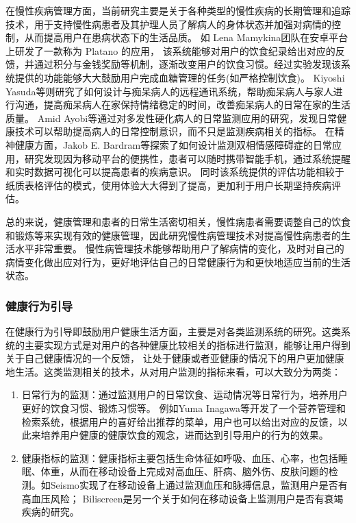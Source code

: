 在慢性疾病管理方面，当前研究主要是关于各种类型的慢性疾病的长期管理和追踪技术，用于支持慢性病患者及其护理人员了解病人的身体状态并加强对病情的控制，从而提高用户在患病状态下的生活品质。
如 Lena Mamykina\cite{burgermaster2019personal}团队在安卓平台上研发了一款称为 Platano 的应用，
该系统能够对用户的饮食纪录给出对应的反馈，并通过积分与金钱奖励等机制，逐渐改变用户的饮食习惯。经过实验发现该系统提供的功能能够大大鼓励用户完成血糖管理的任务(如严格控制饮食)。
Kiyoshi Yasuda等\cite{lazar2016evaluation}则研究了如何设计与痴呆病人的远程通讯系统，帮助痴呆病人与家人进行沟通，提高痴呆病人在家保持情绪稳定的时间，改善痴呆病人的日常在家的生活质量。
Amid Ayobi等\cite{ayobi2017quantifying}通过对多发性硬化病人的日常监测应用的研究，发现日常健康技术可以帮助提高病人的日常控制意识，而不只是监测疾病相关的指标。
在精神健康方面，Jakob E. Bardram等\cite{bardram2013designing}探索了如何设计监测双相情感障碍症的日常应用，研究发现因为移动平台的便携性，患者可以随时携带智能手机，通过系统提醒和实时数据可视化可以提高患者的疾病意识。
同时该系统提供的评估功能相较于纸质表格评估的模式，使用体验大大得到了提高，更加利于用户长期坚持疾病评估。

总的来说，健康管理和患者的日常生活密切相关，慢性病患者需要调整自己的饮食和锻炼等来实现有效的健康管理\cite{nunes2018understanding}，因此研究慢性病管理技术对提高慢性病患者的生活水平非常重要。
慢性病管理技术能够帮助用户了解病情的变化，及时对自己的病情变化做出应对行为，更好地评估自己的日常健康行为和更快地适应当前的生活状态\cite{ayobi2017quantifying}。


\subsubsection{健康行为引导}
在健康行为引导即鼓励用户健康生活方面，主要是对各类监测系统的研究。这类系统的主要实现方式是对用户的各种健康比较相关的指标进行监测，能够让用户得到关于自己健康情况的一个反馈，
让处于健康或者亚健康的情况下的用户更加健康地生活。这类监测相关的技术，从对用户监测的指标来看，可以大致分为两类：
\begin{enumerate}

    \item 日常行为的监测：通过监测用户的日常饮食、运动情况等日常行为，培养用户更好的饮食习惯、锻炼习惯等\cite{purpura2011fit4life, Inagawa2013A,bravata2007using,cordeiro2015barriers,lin2006fish, miller2014stepstream}。 例如Yuma Inagawa等\cite{Inagawa2013A}开发了一个营养管理和检索系统，根据用户的喜好给出推荐的菜单，用户也可以给出对应的反馈，以此来培养用户健康的健康饮食的观念，进而达到引导用户的行为的效果。

    \item 健康指标的监测：健康指标主要包括生命体征如呼吸、血压、心率，也包括睡眠、体重，从而在移动设备上完成对高血压、肝病、脑外伤、皮肤问题的检测\cite{liang2020oralcam}。如Seismo\cite{wang2018seismo}实现了在移动设备上通过监测血压和脉搏信息，监测用户是否有高血压风险；
    Biliscreen\cite{mariakakis2017biliscreen}是另一个关于如何在移动设备上监测用户是否有衰竭疾病的研究。
    
\end{enumerate}


